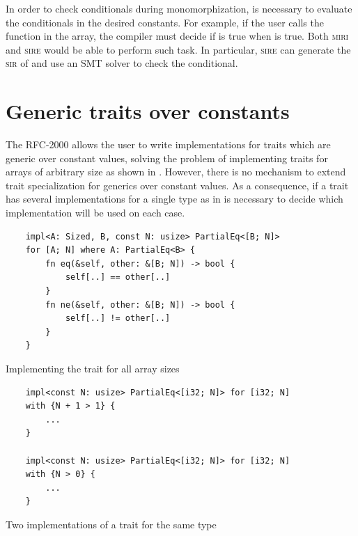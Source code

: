 In order to check conditionals during monomorphization, is necessary to
evaluate the conditionals in the desired constants.  For example, if the user
calls the  function in the \inrust{[1, 2, 3]} array, the compiler
must decide if  is true when  is true.  Both
\textsc{miri} and \textsc{sire} would be able to perform such task. In
particular, \textsc{sire} can generate the \textsc{sir} of  and
use an SMT solver to check the conditional.

\section{Generic traits over constants}

The RFC-2000 allows the user to write implementations for traits which are
generic over constant values, solving the problem of implementing traits for
arrays of arbitrary size as shown in . However,
there is no mechanism to extend trait specialization for generics over constant
values. As a consequence, if a trait has several implementations for a single
type as in  is necessary to decide which
implementation will be used on each case. 

\begin{listing}[h]
	\begin{verbatim}
    impl<A: Sized, B, const N: usize> PartialEq<[B; N]> 
    for [A; N] where A: PartialEq<B> {
        fn eq(&self, other: &[B; N]) -> bool {
            self[..] == other[..]
        }
        fn ne(&self, other: &[B; N]) -> bool {
            self[..] != other[..]
        }
    }
	\end{verbatim}
    \caption{Implementing the  trait for all array sizes}
  \label{lst:trait_const_generics}
\end{listing}

\begin{listing}[h]
	\begin{verbatim}
    impl<const N: usize> PartialEq<[i32; N]> for [i32; N]
    with {N + 1 > 1} {
        ...
    }
   
    impl<const N: usize> PartialEq<[i32; N]> for [i32; N]
    with {N > 0} {
        ...
    }
	\end{verbatim}
    \caption{Two implementations of a trait for the same type}
  \label{lst:trait_const_generics_spec}
\end{listing}

